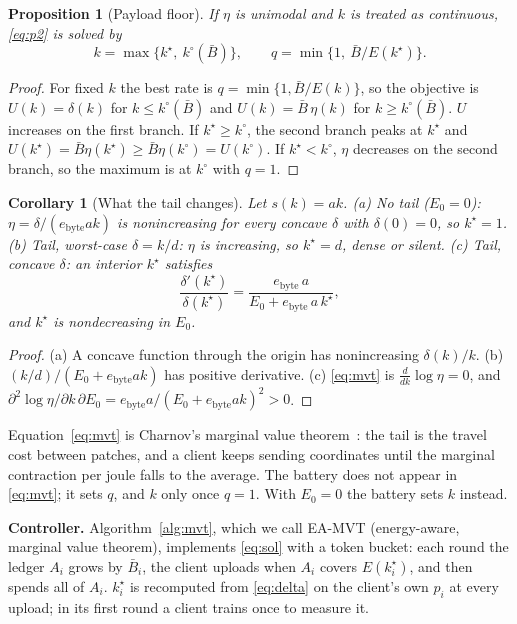 \documentclass[conference,a4paper]{IEEEtran}
\newtheorem{proposition}{Proposition}
\newtheorem{corollary}{Corollary}
\newcommand{\Ez}{E_0}
\newcommand{\kst}{k^\star}
\newcommand{\ko}{k^{\circ}}
\newcommand{\Bbar}{\bar{B}}
\begin{document}
\begin{proposition}[Payload floor]
\label{prop:floor}
If $\eta$ is unimodal and $k$ is treated as continuous, \eqref{eq:p2} is solved by
\begin{equation}
k=\max\{\kst,\ \ko(\Bbar)\},\qquad q=\min\{1,\ \Bbar/E(\kst)\}.
\label{eq:sol}
\end{equation}
\end{proposition}
\begin{proof}
For fixed $k$ the best rate is $q=\min\{1,\Bbar/E(k)\}$, so the objective is $U(k)=\delta(k)$ for $k\le\ko(\Bbar)$ and $U(k)=\Bbar\,\eta(k)$ for $k\ge\ko(\Bbar)$. $U$ increases on the first branch. If $\kst\ge\ko$, the second branch peaks at $\kst$ and $U(\kst)=\Bbar\eta(\kst)\ge\Bbar\eta(\ko)=U(\ko)$. If $\kst<\ko$, $\eta$ decreases on the second branch, so the maximum is at $\ko$ with $q=1$.
\end{proof}

\begin{corollary}[What the tail changes]
\label{cor:tail}
Let $s(k)=ak$. (a) \emph{No tail} ($\Ez=0$): $\eta=\delta/(e_{\text{byte}}ak)$ is nonincreasing for every concave $\delta$ with $\delta(0)=0$, so $\kst=1$. (b) \emph{Tail, worst-case} $\delta=k/d$: $\eta$ is increasing, so $\kst=d$, dense or silent. (c) \emph{Tail, concave} $\delta$: an interior $\kst$ satisfies
\begin{equation}
\frac{\delta'(\kst)}{\delta(\kst)}=\frac{e_{\text{byte}}\,a}{\Ez+e_{\text{byte}}\,a\,\kst},
\label{eq:mvt}
\end{equation}
and $\kst$ is nondecreasing in $\Ez$.
\end{corollary}
\begin{proof}
(a) A concave function through the origin has nonincreasing $\delta(k)/k$. (b) $(k/d)/(\Ez+e_{\text{byte}}ak)$ has positive derivative. (c) \eqref{eq:mvt} is $\frac{d}{dk}\log\eta=0$, and $\partial^2\log\eta/\partial k\,\partial\Ez=e_{\text{byte}}a/(\Ez+e_{\text{byte}}ak)^2>0$.
\end{proof}

Equation~\eqref{eq:mvt} is Charnov's marginal value theorem~\cite{charnov1976}: the tail is the travel cost between patches, and a client keeps sending coordinates until the marginal contraction per joule falls to the average. The battery does not appear in \eqref{eq:mvt}; it sets $q$, and $k$ only once $q=1$. With $\Ez=0$ the battery sets $k$ instead.

\textbf{Controller.} Algorithm~\ref{alg:mvt}, which we call EA-MVT (energy-aware, marginal value theorem), implements \eqref{eq:sol} with a token bucket: each round the ledger $A_i$ grows by $\Bbar_i$, the client uploads when $A_i$ covers $E(\kst_i)$, and then spends all of $A_i$. $\kst_i$ is recomputed from \eqref{eq:delta} on the client's own $p_i$ at every upload; in its first round a client trains once to measure it.
\end{document}
